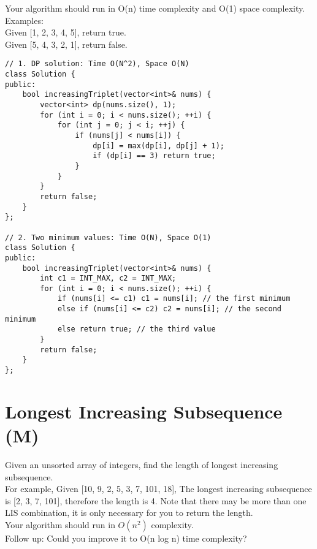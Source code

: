 Your algorithm should run in O(n) time complexity and O(1) space complexity.\\

Examples:\\
Given [1, 2, 3, 4, 5],
return true.\\
Given [5, 4, 3, 2, 1],
return false. \\

\begin{lstlisting}
// 1. DP solution: Time O(N^2), Space O(N)
class Solution {
public:
    bool increasingTriplet(vector<int>& nums) {
        vector<int> dp(nums.size(), 1);
        for (int i = 0; i < nums.size(); ++i) {
            for (int j = 0; j < i; ++j) {
                if (nums[j] < nums[i]) {
                    dp[i] = max(dp[i], dp[j] + 1);
                    if (dp[i] == 3) return true;
                }
            }
        }
        return false;
    }
};

// 2. Two minimum values: Time O(N), Space O(1)
class Solution {
public:
    bool increasingTriplet(vector<int>& nums) {
        int c1 = INT_MAX, c2 = INT_MAX;
        for (int i = 0; i < nums.size(); ++i) {
            if (nums[i] <= c1) c1 = nums[i]; // the first minimum
            else if (nums[i] <= c2) c2 = nums[i]; // the second minimum
            else return true; // the third value
        }
        return false;
    }
};
\end{lstlisting}


\section{Longest Increasing Subsequence (M)}
Given an unsorted array of integers, find the length of longest increasing subsequence.\\

For example,
Given [10, 9, 2, 5, 3, 7, 101, 18],
The longest increasing subsequence is [2, 3, 7, 101], therefore the length is 4. Note that there may be more than one LIS combination, it is only necessary for you to return the length.\\

Your algorithm should run in $O(n^2)$ complexity.\\

Follow up: Could you improve it to O(n log n) time complexity? \\

